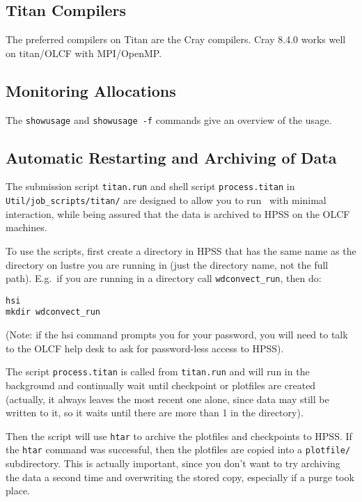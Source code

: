 \subsection{Titan Compilers}

The preferred compilers on Titan are the Cray compilers.  
Cray 8.4.0 works well on titan/OLCF with MPI/OpenMP.


\subsection{Monitoring Allocations}

The {\tt showusage} and {\tt showusage -f} commands give an
overview of the usage.

\subsection{Automatic Restarting and Archiving of Data}

The submission script {\tt titan.run} and shell script
{\tt process.titan} in {\tt Util/job\_scripts/titan/}
are designed to allow you to run \maestro\ with minimal interaction,
while being assured that the data is archived to HPSS on the OLCF
machines.

To use the scripts, first create a directory in HPSS that has the same
name as the directory on lustre you are running in (just the directory
name, not the full path).  E.g.\ if you are running in a directory
call {\tt wdconvect\_run}, then do:
\begin{verbatim}
hsi
mkdir wdconvect_run
\end{verbatim}
(Note: if the hsi command prompts you for your password, you will need
to talk to the OLCF help desk to ask for password-less access to
HPSS).

The script {\tt process.titan} is called from {\tt titan.run} and will
run in the background and continually wait until checkpoint or
plotfiles are created (actually, it always leaves the most recent one
alone, since data may still be written to it, so it waits until there
are more than 1 in the directory).

Then the script will use {\tt htar} to archive the plotfiles and
checkpoints to HPSS.  If the {\tt htar} command was successful, then
the plotfiles are copied into a {\tt plotfile/} subdirectory.  This is
actually important, since you don't want to try archiving the data a
second time and overwriting the stored copy, especially if a purge
took place.

